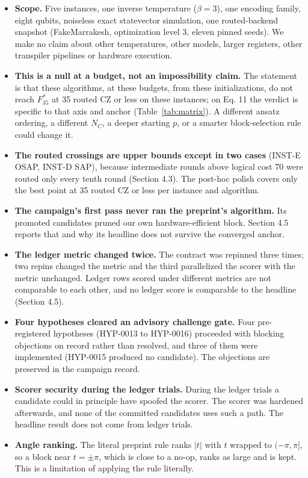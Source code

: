 \documentclass[11pt]{article}
\begin{document}
\begin{itemize}
\item \textbf{Scope.} Five instances, one inverse temperature ($\beta = 3$), one encoding family, eight qubits, noiseless exact statevector simulation, one routed-backend snapshot (FakeMarrakesh, optimization level 3, eleven pinned seeds). We make no claim about other temperatures, other models, larger registers, other transpiler pipelines or hardware execution.
\item \textbf{This is a null at a budget, not an impossibility claim.} The statement is that these algorithms, at these budgets, from these initializations, do not reach $F_{35}^{*}$ at 35 routed CZ or less on these instances; on Eq. 11 the verdict is specific to that axis and anchor (Table~\ref{tab:matrix}). A different ansatz ordering, a different $N_C$, a deeper starting $p$, or a smarter block-selection rule could change it.
\item \textbf{The routed crossings are upper bounds except in two cases} (INST-E OSAP, INST-D SAP), because intermediate rounds above logical cost 70 were routed only every tenth round (Section 4.3). The post-hoc polish covers only the best point at 35 routed CZ or less per instance and algorithm.
\item \textbf{The campaign's first pass never ran the preprint's algorithm.} Its promoted candidates pruned our own hardware-efficient block. Section 4.5 reports that and why its headline does not survive the converged anchor.
\item \textbf{The ledger metric changed twice.} The contract was repinned three times; two repins changed the metric and the third parallelized the scorer with the metric unchanged. Ledger rows scored under different metrics are not comparable to each other, and no ledger score is comparable to the headline (Section 4.5).
\item \textbf{Four hypotheses cleared an advisory challenge gate.} Four pre-registered hypotheses (HYP-0013 to HYP-0016) proceeded with blocking objections on record rather than resolved, and three of them were implemented (HYP-0015 produced no candidate). The objections are preserved in the campaign record.
\item \textbf{Scorer security during the ledger trials.} During the ledger trials a candidate could in principle have spoofed the scorer. The scorer was hardened afterwards, and none of the committed candidates uses such a path. The headline result does not come from ledger trials.
\item \textbf{Angle ranking.} The literal preprint rule ranks $|t|$ with $t$ wrapped to $(-\pi,\pi]$, so a block near $t = \pm\pi$, which is close to a no-op, ranks as large and is kept. This is a limitation of applying the rule literally.

\end{itemize}
\end{document}
